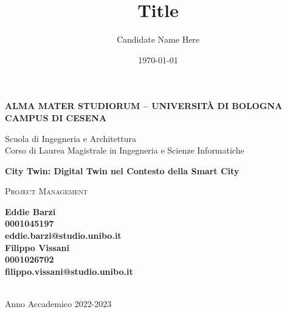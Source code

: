 \title{Title}
\author{Candidate Name Here}
\date{\today}

\begin{titlepage}
	\begin{center}
		
		\large
		\textbf{ALMA MATER STUDIORUM -- UNIVERSITÀ DI BOLOGNA \\ CAMPUS DI CESENA}
		\\
		\noindent\hrulefill
		\vspace{0.4cm}
		
		\Large
		Scuola di Ingegneria e Architettura \\
		Corso di Laurea Magistrale in Ingegneria e Scienze Informatiche
		
		\Huge
		\vspace{4cm}
		\textbf{
			City Twin: Digital Twin nel Contesto della Smart City
		}
		
		\large
		\vspace{1cm}
		\textsc{Project Management}
		
		\vspace{5.5cm}
		\begin{minipage}[t]{0.64\textwidth}
			\begin{flushleft}
				\textbf{Eddie Barzi}
				\\
				\textbf{0001045197}
				\\
				\textbf{eddie.barzi@studio.unibo.it}
				\\
				\vspace{0.4cm}
				\textbf{Filippo Vissani}
				\\
				\textbf{0001026702}
				\\
				\textbf{filippo.vissani@studio.unibo.it}
			\end{flushleft}
		\end{minipage}
		
		\vfill
		\noindent\hrulefill
		\vspace{0.3cm}
		\Large
		\\
		Anno Accademico 2022-2023
	\end{center}
\end{titlepage}
\restoregeometry
